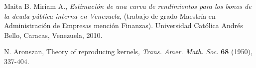 \begin{thebibliography}{99}

 {\sc Maita B. Miriam A.}, {\it Estimaci\'on de una curva de rendimientos para los bonos de la deuda p\'ublica interna en Venezuela}, (trabajo de grado Maestr\'ia en Administraci\'on de Empresas menci\'on Finanzas).  Universidad Cat\'olica Andr\'es Bello, Caracas, Venezuela, 2010.

 {\sc N. Aronszan}, Theory of reproducing kernels, {\it Trans. Amer. Math. Soc.}
\textbf{68} (1950), 337-404.  



\end{thebibliography}
